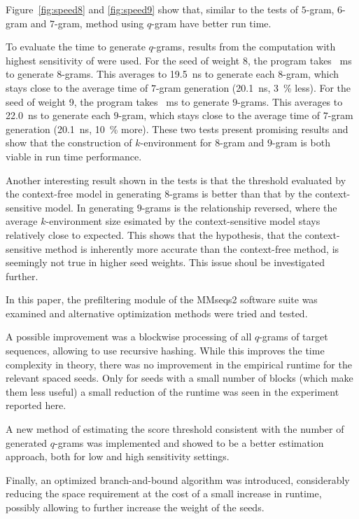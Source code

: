 \documentclass[twoside,a4paper,bsc]{master}
\newcommand{\Qgram}[1]{\(#1\)-gram}
\begin{document}
Figure~\ref{fig:speed8} and \ref{fig:speed9} show that, similar to the tests of
\Qgram{5}, \Qgram{6} and \Qgram{7}, method using \Qgram{q} have better run time.

To evaluate the time to generate \Qgram{q}s, results from the computation with 
highest sensitivity of  were used.
For the seed of weight 8, the program takes ~ms to generate 
 \Qgram{8}s. This averages to 19.5~ns to generate each 
\Qgram{8}, which stays close to the average time of \Qgram{7} generation 
(20.1~ns, 3~\% less). For the seed of weight 9, the program takes 
~ms to generate   \Qgram{9}s. This averages 
to 22.0~ns to generate each \Qgram{9}, which stays close to the average time of 
\Qgram{7} generation (20.1~ns, 10~\% more). These two tests present promising 
results and show that the construction of \(k\)-environment for \Qgram{8} and 
\Qgram{9} is both viable in run time performance.

Another interesting result shown in the tests is that the threshold evaluated by
the context-free model in generating \Qgram{8}s is better than that by the 
context-sensitive model. In generating \Qgram{9}s is the relationship reversed,
where the average \(k\)-environment size esimated by the context-sensitive model
stays relatively close to expected. This shows that the hypothesis, that the 
context-sensitive method is inherently more accurate than the context-free 
method, is seemingly not true in higher seed weights. This issue shoul be 
investigated further.

In this paper, the prefiltering module of the MMseqs2 software suite was
examined and alternative optimization methods were tried and tested. 

A possible improvement was a blockwise processing of all \(q\)-grams
of target sequences, allowing to use recursive hashing. While this
improves the time complexity in theory, there was no improvement in the
empirical runtime for the relevant spaced seeds.
Only for seeds with a small number of
blocks (which make them less useful) a small reduction of the runtime
was seen in the experiment reported here. 

A new method of estimating the score threshold consistent with the number
of generated \Qgram{q}s was implemented and showed to be a better estimation
approach, both for low and high sensitivity settings. 

Finally, an optimized
branch-and-bound algorithm was introduced, considerably reducing the
space requirement at the cost of a small
increase in runtime, possibly allowing to further increase the weight
of the seeds.
\end{document}
